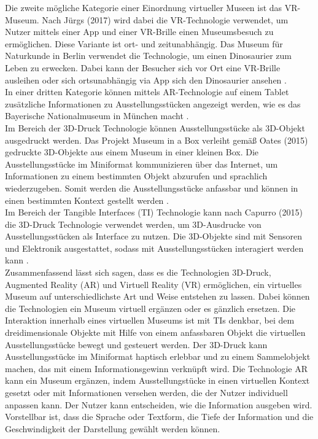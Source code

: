 \documentclass[runningheads,a4paper, 12pt]{llncs}
\begin{document}
Die zweite mögliche Kategorie einer Einordnung virtueller Museen ist das VR-Museum. Nach Jürgs (2017) wird dabei die VR-Technologie verwendet, um Nutzer mittels einer App und einer VR-Brille einen Museumsbesuch zu ermöglichen. Diese Variante ist ort- und zeitunabhängig. Das Museum für Naturkunde in Berlin verwendet die Technologie, um einen Dinosaurier zum Leben zu erwecken. Dabei kann der Besucher sich vor Ort eine VR-Brille ausleihen oder sich ortsunabhängig via App sich den Dinosaurier ansehen \cite{GoetheInstitute.V..2017}.\\

In einer dritten Kategorie können mittels AR-Technologie auf einem Tablet zusätzliche Informationen zu Ausstellungsstücken angezeigt werden, wie es das Bayerische Nationalmuseum in München macht \cite{GoetheInstitute.V..2017}.\\

Im Bereich der 3D-Druck Technologie können Ausstellungsstücke als 3D-Objekt ausgedruckt werden. Das Projekt Museum in a Box verleiht gemäß Oates (2015) gedruckte 3D-Objekte aus einem Museum in einer kleinen Box. Die Ausstellungsstücke im Miniformat kommunizieren über das Internet, um Informationen zu einem bestimmten Objekt abzurufen und sprachlich wiederzugeben. Somit werden die Ausstellungsstücke anfassbar und können in einen bestimmten Kontext gestellt werden \cite{GeorgeOates.2015}.\\

Im Bereich der Tangible Interfaces (TI) Technologie kann nach Capurro (2015) die 3D-Druck Technologie verwendet werden, um 3D-Ausdrucke von Ausstellungsstücken als Interface zu nutzen. Die 3D-Objekte sind mit Sensoren und Elektronik ausgestattet, sodass mit Ausstellungsstücken interagiert werden kann \cite{Capurro.2015}.\\ 

Zusammenfassend lässt sich sagen, dass es die Technologien 3D-Druck, Augmented Reality (AR) und Virtuell Reality (VR) ermöglichen, ein virtuelles Museum auf unterschiedlichste Art und Weise entstehen zu lassen. Dabei können die Technologien ein Museum virtuell ergänzen oder es gänzlich ersetzen. Die Interaktion innerhalb eines virtuellen Museums ist mit TIs denkbar, bei dem dreidimensionale Objekte mit Hilfe von einem anfassbaren Objekt die virtuellen Ausstellungsstücke bewegt und gesteuert werden. Der 3D-Druck kann Ausstellungsstücke im Miniformat haptisch erlebbar und zu einem Sammelobjekt machen, das mit einem Informationsgewinn verknüpft wird. Die Technologie AR kann ein Museum ergänzen, indem Ausstellungstücke in einen virtuellen Kontext gesetzt oder mit Informationen versehen werden, die der Nutzer individuell anpassen kann. Der Nutzer kann entscheiden, wie die Information ausgeben wird. Vorstellbar ist, dass die Sprache oder Textform, die Tiefe der Information und die Geschwindigkeit der Darstellung gewählt werden können.\\
\end{document}
